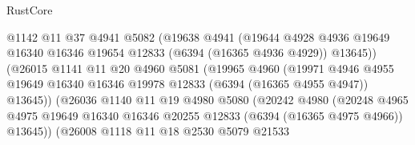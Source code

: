 \begin{lexlean}{RustCore}
\begin{coremodule}
                                @1142
                                @11
                                @37
                                @4941
                                @5082
                                (@19638
                                  @4941
                                  (@19644
                                    @4928
                                    @4936
                                    @19649
                                    @16340
                                    @16346
                                    @19654
                                    @12833
                                    (@6394 (@16365 @4936 @4929))
                                    @13645))
                                (@26015
                                  @1141
                                  @11
                                  @20
                                  @4960
                                  @5081
                                  (@19965
                                    @4960
                                    (@19971
                                      @4946
                                      @4955
                                      @19649
                                      @16340
                                      @16346
                                      @19978
                                      @12833
                                      (@6394 (@16365 @4955 @4947))
                                      @13645))
                                  (@26036
                                    @1140
                                    @11
                                    @19
                                    @4980
                                    @5080
                                    (@20242
                                      @4980
                                      (@20248
                                        @4965
                                        @4975
                                        @19649
                                        @16340
                                        @16346
                                        @20255
                                        @12833
                                        (@6394 (@16365 @4975 @4966))
                                        @13645))
                                    (@26008
                                      @1118
                                      @11
                                      @18
                                      @2530
                                      @5079
                                      @21533

\end{coremodule}
\end{lexlean}

